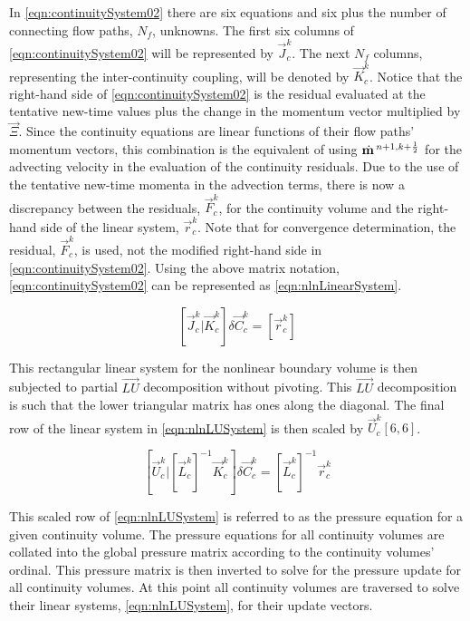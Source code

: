 In \eqref{eqn:continuitySystem02} there are six equations and six plus the number of connecting flow paths, $N_{f}$, unknowns.
The first six columns of \eqref{eqn:continuitySystem02} will be represented by $\vec{J}^{k}_{c}$.
The next $N_{f}$ columns, representing the inter-continuity coupling, will be denoted  by $\vec{K}^{k}_{c}$.
Notice that the right-hand side of \eqref{eqn:continuitySystem02} is the residual evaluated at the tentative new-time values plus the change in the momentum vector multiplied by $\vec{\Xi}$.
Since the continuity equations are linear functions of their flow paths' momentum vectors, this combination is the equivalent of using $\momVec{}^{n+1, k + \onehalf}$ for the advecting velocity in the evaluation of the continuity residuals.
Due to the use of the tentative new-time momenta in the advection terms, there is now a discrepancy between the residuals, $\vec{F}^{k}_{c}$, for the continuity volume and the right-hand side of the linear system, $\vec{r}^{k}_{c}$.
Note that for convergence determination, the residual, $\vec{F}^{k}_{c}$, is used, not the modified right-hand side in \eqref{eqn:continuitySystem02}.
Using the above matrix notation, \eqref{eqn:continuitySystem02} can be represented as \eqref{eqn:nlnLinearSystem}.

\begin{equation}
\label{eqn:nlnLinearSystem}
\left[ \vec{J}^{k}_{c} \vert \vec{K}^{k}_{c} \right] \delta \vec{C}_{c}^{k} = \left[\vec{r}^{k}_{c}\right]
\end{equation}

This rectangular linear system for the nonlinear boundary volume is then subjected to partial $\vec{LU}$ decomposition without pivoting.
This $\vec{LU}$ decomposition is such that the lower triangular matrix has ones along the diagonal.
The final row of the linear system in \eqref{eqn:nlnLUSystem} is then scaled by $\vec{U}^{k}_{c}[6,6]$.

\begin{equation}
\label{eqn:nlnLUSystem}
\left[ \vec{U}^{k}_{c} \vert \left[\vec{L}^{k}_{c}\right]^{-1}\vec{K}^{k}_{c} \right] \delta \vec{C}^{k}_{c} = \left[\vec{L}^{k}_{c}\right]^{-1}\vec{r}^{k}_{c}
\end{equation}

This scaled row of \eqref{eqn:nlnLUSystem} is referred to as the pressure equation for a given continuity volume.
The pressure equations for all continuity volumes are collated into the global pressure matrix according to the continuity volumes' ordinal.
This pressure matrix is then inverted to solve for the pressure update for all continuity volumes.
At this point all continuity volumes are traversed to solve their linear systems, \eqref{eqn:nlnLUSystem}, for their update vectors.

